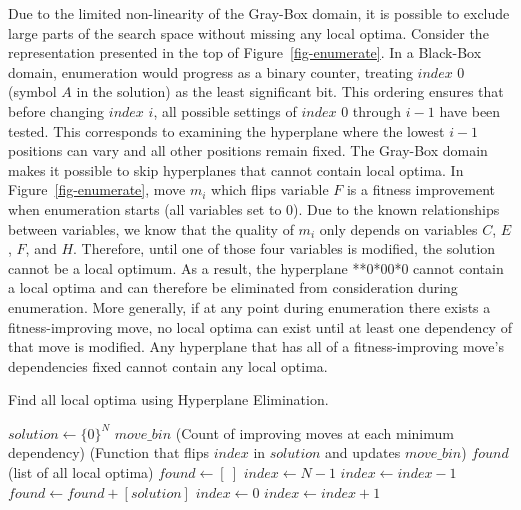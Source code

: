 \documentclass[runningheads,a4paper]{llncs}
\begin{document}
Due to the limited non-linearity of the Gray-Box domain, it is possible to exclude large
parts of the search space without missing any local optima.
Consider the representation presented in the top of Figure~\ref{fig-enumerate}. In a Black-Box
domain, enumeration would progress as a binary counter, treating $index$ 0 (symbol $A$ in the solution) as
the least significant bit. This ordering ensures that before changing $index$ $i$, all possible settings of $index$
0 through $i-1$ have been tested. This corresponds to examining the hyperplane where the lowest $i-1$ positions
can vary and all other positions remain fixed. The Gray-Box domain makes it possible to skip hyperplanes
that cannot contain local optima. In Figure~\ref{fig-enumerate}, move $m_i$ which flips variable $F$ is a fitness improvement
when enumeration starts (all variables set to 0). Due to the known relationships between variables,
we know that the quality of $m_i$ only depends on variables $C$, $E$, $F$, and $H$.
Therefore, until one of those four variables is modified, the solution cannot be a local optimum.
As a result, the hyperplane **0*00*0 cannot contain a local optima and can
therefore be eliminated from consideration during enumeration.
More generally, if at any point during enumeration
there exists a fitness-improving move, no local optima can exist until at least one
dependency of that move is modified. Any hyperplane that has all of a fitness-improving
move's dependencies fixed cannot contain any local optima.

\begin{algorithm}
  \caption{Find all local optima using Hyperplane Elimination.}
  \label{alg-enumerate}
  \begin{algorithmic}[1]
    \Require $solution \leftarrow \{0\}^N$
    \Require $move\_bin$ (Count of improving moves at each minimum dependency)
    \Require {} (Function that flips $index$ in $solution$ and updates $move\_bin$)
    \Ensure $found$ (list of all local optima)
    \State $found \leftarrow [~]$
    \State $index \leftarrow N-1$
      \label{alg-enumerate-bincheck}
        \State $index \leftarrow index-1$
      \EndWhile
        \State $found \leftarrow found + [solution]$
        \State $index \leftarrow 0$
      \EndIf
      \label{alg-enumerate-counter}
        \State {}
        \State $index \leftarrow index + 1$
      \EndWhile
        \State {}\label{alg-enumerate-insert}
      \EndIf
    \EndWhile
  \end{algorithmic}
\end{algorithm}
\end{document}

